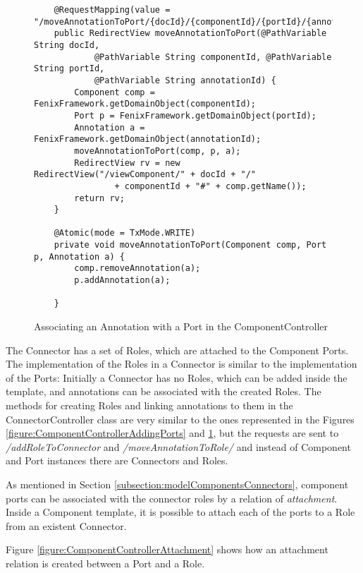 \begin{figure}[h]
\lstset{style=customjava}
\begin{lstlisting}
	@RequestMapping(value = "/moveAnnotationToPort/{docId}/{componentId}/{portId}/{annotationId}")
	public RedirectView moveAnnotationToPort(@PathVariable String docId,
			@PathVariable String componentId, @PathVariable String portId,
			@PathVariable String annotationId) {
		Component comp = FenixFramework.getDomainObject(componentId);
		Port p = FenixFramework.getDomainObject(portId);
		Annotation a = FenixFramework.getDomainObject(annotationId);
		moveAnnotationToPort(comp, p, a);
		RedirectView rv = new RedirectView("/viewComponent/" + docId + "/"
				+ componentId + "#" + comp.getName());
		return rv;
	}
	
	@Atomic(mode = TxMode.WRITE)
	private void moveAnnotationToPort(Component comp, Port p, Annotation a) {
		comp.removeAnnotation(a);
		p.addAnnotation(a);

	}	
\end{lstlisting}
\caption{Associating an Annotation with a Port in the ComponentController}
\label{figure:ComponentControllerLinkToPort}
\end{figure}

The Connector has a set of Roles, which are attached to the Component Ports. The implementation of the Roles in a Connector is similar to the implementation of the Ports: Initially a Connector has no Roles, which can be added inside the template, and annotations can be associated with the created Roles. The methods for creating Roles and linking annotations to them in the ConnectorController class are very similar to the ones represented in the Figures \ref{figure:ComponentControllerAddingPorts} and \ref{figure:ComponentControllerLinkToPort}, but the requests are sent to \textit{/addRoleToConnector} and \textit{/moveAnnotationToRole/} and instead of Component and Port instances there are Connectors and Roles.

As mentioned in Section \ref{subsection:modelComponentsConnectors}, component ports can be associated with the connector roles by a relation of \textit{attachment}. Inside a Component template, it is possible to attach each of the ports to a Role from an existent Connector.

Figure \ref{figure:ComponentControllerAttachment} shows how an attachment relation is created between a Port and a Role.

